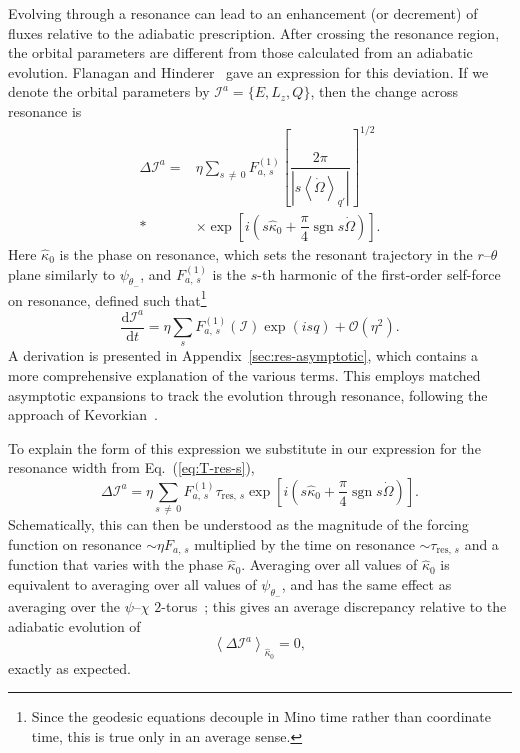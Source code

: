 \documentclass[aps,prd,amsfonts,amssymb,amsmath,nofootinbib,showpacs,superscriptaddress,twocolumn,floatfix]{revtex4-1}
\newcommand{\eqnref}[1]{Eq.~(\ref{eq:#1})}
\newcommand{\apref}[1]{Appendix~\ref{sec:#1}}
\newcommand{\dd}{\ensuremath{\mathrm{d}}}
\newcommand{\diff}[2]{\ensuremath{\dfrac{\dd {#1}}{\dd {#2}}}}
\newcommand{\order}[1]{\ensuremath{\mathcal{O}({#1})}}
\DeclareMathOperator{\sgn}{sgn}
\begin{document}
Evolving through a resonance can lead to an enhancement (or decrement) of fluxes relative to the adiabatic prescription. After crossing the resonance region, the orbital parameters are different from those calculated from an adiabatic evolution. Flanagan and Hinderer~\cite{Flanagan2012} gave an expression for this deviation. If we denote the orbital parameters by $\mathcal{I}^a = \{E,L_z,Q\}$, then the change across resonance is
\begin{align}
\Delta \mathcal{I}^a = {} & \eta\sum_{s\,\neq\,0}F_{a,\,s}^{(1)}\left[\dfrac{2\pi}{\left|s \left\langle\dot{\Omega}\right\rangle_{q'}\right|}\right]^{1/2} \nonumber \\*
 {} & \times {} \exp\left[i\left(s \widehat{\kappa}_0 + \dfrac{\pi}{4} \sgn s\dot{\Omega}\right)\right]. 
\end{align}
Here $\widehat{\kappa}_0$ is the phase on resonance, which sets the resonant trajectory in the $r$--$\theta$ plane similarly to $\psi_{\theta_-}$, and $F_{a,\,s}^{(1)}$ is the $s$-th harmonic of the first-order self-force on resonance, defined such that\footnote{Since the geodesic equations decouple in Mino time rather than coordinate time, this is true only in an average sense.}
\begin{equation}
\diff{\mathcal{I}^a}{t} = \eta\sum_s F_{a,\,s}^{(1)}(\boldsymbol{\mathcal{I}})\exp(is q) + \order{\eta^2}.
\end{equation}
A derivation is presented in \apref{res-asymptotic}, which contains a more comprehensive explanation of the various terms. This employs matched asymptotic expansions to track the evolution through resonance, following the approach of Kevorkian~\cite{Kevorkian1987}.

To explain the form of this expression we substitute in our expression for the resonance width from \eqnref{T-res-s},
\begin{equation}
\label{eq:delta-I-a}
\Delta \mathcal{I}^a = \eta\sum_{s\,\neq\,0}F_{a,\,s}^{(1)}\tau_{\mathrm{res},\,s}\exp\left[i\left(s \widehat{\kappa}_0 + \dfrac{\pi}{4} \sgn s\dot{\Omega}\right)\right]. 
\end{equation}
Schematically, this can then be understood as the magnitude of the forcing function on resonance $\sim \eta F_{a,\,s}$ multiplied by the time on resonance $\sim \tau_{\mathrm{res},\,s}$ and a function that varies with the phase $\widehat{\kappa}_0$. Averaging over all values of $\widehat{\kappa}_0$ is equivalent to averaging over all values of $\psi_{\theta_-}$, and has the same effect as averaging over the $\psi$--$\chi$ $2$-torus~\cite{Grossman2011}; this gives an average discrepancy relative to the adiabatic evolution of
\begin{equation}
\left\langle \Delta \mathcal{I}^a \right\rangle_{\hat{\kappa}_0} = 0,
\end{equation}
exactly as expected.
\end{document}
